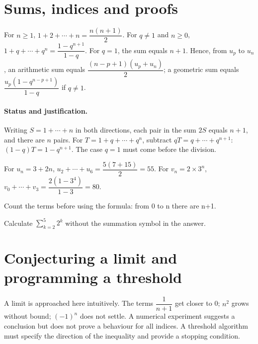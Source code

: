 \section{Sums, indices and proofs}\label{C01-U4}
\begin{keypoint}
For $n\geq1$, $1+2+\cdots +n=\dfrac{n(n+1)}{2}$. For $q\ne1$ and $n\geq0$, $1+q+\cdots +q^n=\dfrac{1-q^{n+1}}{1-q}$. For $q=1$, the sum equals $n+1$. Hence, from $u_p$ to $u_n$, an arithmetic sum equals $\dfrac{(n-p+1)(u_p+u_n)}{2}$; a geometric sum equals $\dfrac{u_p(1-q^{n-p+1})}{1-q}$ if $q\ne1$.
\end{keypoint}
\paragraph{Status and justification.} Writing $S=1+\cdots+n$ in both directions, each pair in the sum $2S$ equals $n+1$, and there are $n$ pairs. For $T=1+q+\cdots+q^n$, subtract $qT=q+\cdots+q^{n+1}$: $(1-q)T=1-q^{n+1}$. The case $q=1$ must come before the division.
\begin{example}For $u_n=3+2n$, $u_2+\cdots +u_6=\dfrac{5(7+15)}{2}=55$. For $v_n=2\times3^n$, $v_0+\cdots +v_3=\dfrac{2(1-3^4)}{1-3}=80$.\end{example}\label{C01-EX4}
\begin{pitfall}Count the terms before using the formula: from 0 to n there are n+1.\end{pitfall}
\begin{application}Calculate $\sum_{k=2}^{5}2^k$ without the summation symbol in the answer.\end{application}\label{C01-AP4}
\section{Conjecturing a limit and programming a threshold}\label{C01-U5}
\begin{keypoint}
A limit is approached here intuitively. The terms $\dfrac{1}{n+1}$ get closer to 0; $n^2$ grows without bound; $(-1)^n$ does not settle. A numerical experiment suggests a conclusion but does not prove a behaviour for all indices. A threshold algorithm must specify the direction of the inequality and provide a stopping condition.
\end{keypoint}

